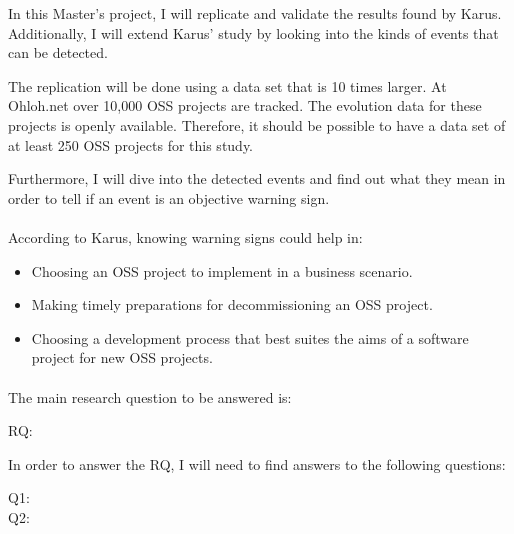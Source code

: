 In this Master's project, I will replicate and validate the results found by
Karus. Additionally, I will extend Karus' study by looking into the kinds of
events that can be detected.

The replication will be done using a data set that is 10 times larger. At
Ohloh.net over 10,000 OSS projects are tracked. The evolution data for these
projects is openly available. Therefore, it should be possible to have a data
set of at least 250 OSS projects for this study.

Furthermore, I will dive into the detected events and find out what they mean
in order to tell if an event is an objective warning sign.

\paragraph{}
According to Karus, knowing warning signs could help in:
\begin{itemize}
	\item Choosing an OSS project to implement in a business scenario.
	\item Making timely preparations for decommissioning an OSS project.
	\item Choosing a development process that best suites the aims of a software
	project for new OSS projects.
\end{itemize}

\paragraph{}
The main research question to be answered is:
\begin{description}
	\item[RQ:] \emph{\researchQuestion} \cite{karus2013}
\end{description}

In order to answer the RQ, I will need to find answers to the following
questions:
\begin{description}
	\item[Q1:] \subQuestionOne
	\item[Q2:] \subQuestionTwo
\end{description}
